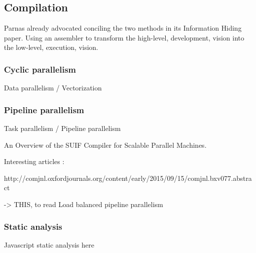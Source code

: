\subsection{Compilation}

Parnas already advocated conciling the two methods in its Information Hiding paper.
Using an assembler to transform the high-level, development, vision into the low-level, execution, vision.


\subsubsection{Cyclic parallelism}
Data parallelism / Vectorization

\subsubsection{Pipeline parallelism}
Task parallelism / Pipeline parallelism


An Overview of the SUIF Compiler for Scalable Parallel Machines. \cite{Amarasinghe1995}


Interesting articles :

http://comjnl.oxfordjournals.org/content/early/2015/09/15/comjnl.bxv077.abstract


-> THIS, to read
Load balanced pipeline parallelism \cite{Kamruzzaman2013}


\subsubsection{Static analysis}

Javascript static analysis here

\endinput

There are attempts at conciliating the two approaches.

Without a transformation process :
Erlang - Jay Nelson, Structured Programming Using Processes









Continuations and coroutines \cite{Haynes1984}
-> THIS

Parallel closures, a new twist on an old idea \cite{Matsakis2012a}

Making state explicit ... \cite{Fernandez2014a}

http://2015.splashcon.org/event/splash2015-splash-i-lindsey-kuper-talk


Continuation of work on SEDA \cite{Salmito2014}